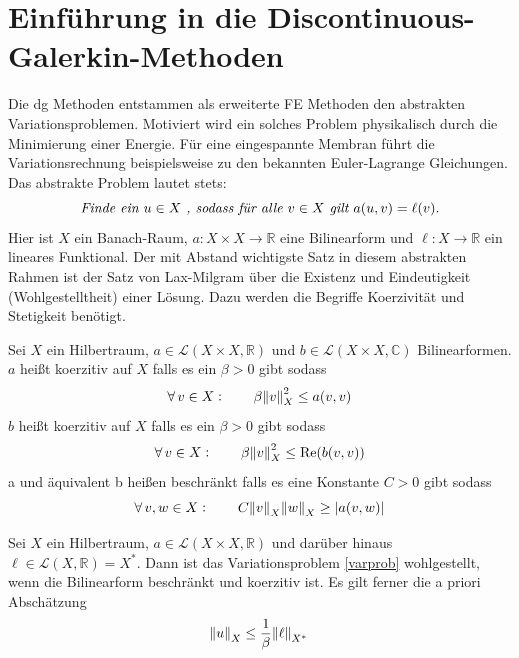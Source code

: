 \section{Einführung in die Discontinuous-Galerkin-Methoden}
Die \ac{dg} Methoden entstammen als erweiterte FE Methoden den abstrakten Variationsproblemen. Motiviert wird ein solches Problem physikalisch durch die Minimierung einer Energie. Für eine eingespannte Membran führt die Variationsrechnung beispielsweise zu den bekannten Euler-Lagrange Gleichungen. Das abstrakte Problem lautet stets:
\begin{equation}\label{varprob}
      \emph{Finde ein } u\in X\emph{ , sodass für alle } v\in X \emph{ gilt } a(u,v) = \ell(v).
\end{equation}
Hier ist $X$ ein Banach-Raum, $a:X\times X \rightarrow \mathbb{R}$ eine Bilinearform und ${\ell:X\rightarrow \mathbb{R}}$ ein lineares Funktional.
Der mit Abstand wichtigste Satz in diesem abstrakten Rahmen ist der Satz von Lax-Milgram \cite{buchPietro} über die Existenz und Eindeutigkeit (Wohlgestelltheit) einer Lösung. Dazu werden die Begriffe Koerzivität und Stetigkeit benötigt.
\begin{definition} \label{def:koerz}
  Sei $X$ ein Hilbertraum, $a \in \mathcal{L}(X\times X, \mathbb{R})$ und $b \in \mathcal{L}(X\times X, \mathbb{C})$ Bilinearformen. $a$ heißt koerzitiv auf $X$ falls es ein $\beta>0$ gibt sodass
  \begin{equation*}
    \forall \, v \in X : \qquad \beta\norm{v}^2_X \leq a(v,v)
  \end{equation*}
  $b$ heißt koerzitiv auf $X$ falls es ein $\beta>0$ gibt sodass
  \begin{equation}
    \forall \, v \in X : \qquad \beta\norm{v}^2_X \leq  \operatorname{Re}(b(v,v))   \label{eq:koerz_imag}
  \end{equation}
  a und äquivalent b heißen beschränkt falls es eine Konstante $C>0$ gibt sodass
  \begin{equation*}
    \forall \, v,w \in X : \qquad C\norm{v}_X \norm{w}_X \geq |a(v,w)|
  \end{equation*}
\end{definition}
\begin{satz}\label{laxmilgram}
  Sei $X$ ein Hilbertraum, $a \in \mathcal{L}(X\times X, \mathbb{R})$ und darüber hinaus ${\ell\in\mathcal{L}(X,\mathbb{R})=X^*}$. Dann ist das Variationsproblem \ref{varprob} wohlgestellt, wenn die Bilinearform beschränkt und koerzitiv ist. Es gilt ferner die a priori Abschätzung
  \begin{equation*}
    \norm{u}_X \leq \frac{1}{\beta} \norm{\ell}_{X^*}
  \end{equation*}
\end{satz}
